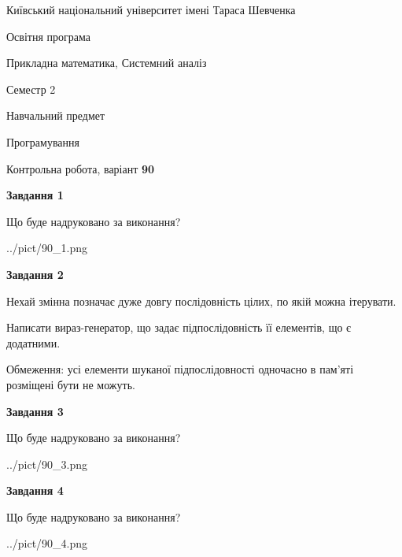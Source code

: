 \documentclass[12pt, ukrainian]{article}
\begin{document}
{{\begin {small}\par
{ \center  Київський національний університет імені Тараса Шевченка \par}
{\parbox {5 cm}{Освітня програма \hfill}{\parbox {8 cm}{Прикладна математика, Системний аналіз \hfill}}\parbox {5 cm}{\hfill Семестр 2}}\par
{\parbox {5 cm} {Навчальний предмет \hfill}\parbox {7 cm}{Програмування \hfill}\parbox {6cm}{\hfill}\par}\vspace{-7pt} \end{small}}{\center Контрольна робота, варіант  \No \textbf
{ 90 }\par}}
{
\begin {large}
{\begin {center}\textbf{Завдання 1}\end {center}}\par
Що буде надруковано за виконання?\par\par
\begin{center}
	{../pict/90_1.png}
\end{center}
\newpage

{\begin {center}\textbf{Завдання 2}\end {center}}\par
Нехай змінна  позначає дуже довгу послідовність цілих, по якій можна ітерувати.

Написати вираз-генератор, що задає підпослідовність її елементів, що є додатни\-ми.

Обмеження: усі елементи шуканої підпослідовності одночасно в пам'яті розміщені бути не можуть.\par
\newpage

{\begin {center}\textbf{Завдання 3}\end {center}}\par
Що буде надруковано за виконання?
\begin{center}
	{../pict/90_3.png}
\end{center}
\newpage

{\begin {center}\textbf{Завдання 4}\end {center}}\par
Що буде надруковано за виконання?\par
\begin{center}
	{../pict/90_4.png}
\end{center}
\newpage


\end{large}}
\end{document}
